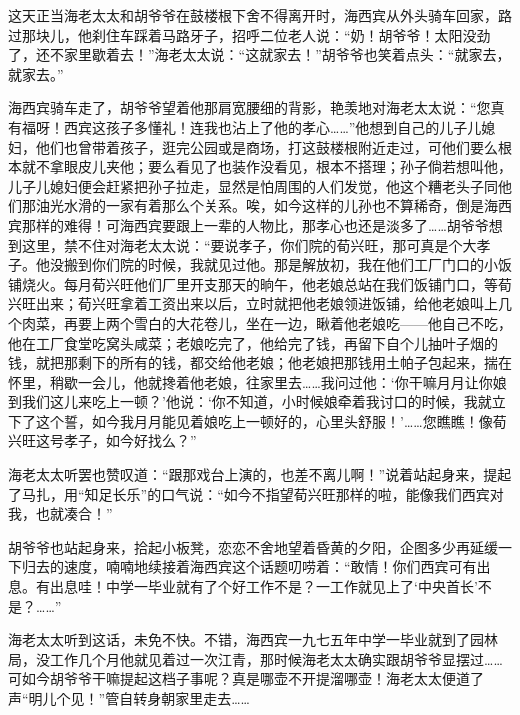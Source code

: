 \par 这天正当海老太太和胡爷爷在鼓楼根下舍不得离开时，海西宾从外头骑车回家，路过那块儿，他刹住车踩着马路牙子，招呼二位老人说：“奶！胡爷爷！太阳没劲了，还不家里歇着去！”海老太太说：“这就家去！”胡爷爷也笑着点头：“就家去，就家去。”
\par 海西宾骑车走了，胡爷爷望着他那肩宽腰细的背影，艳羡地对海老太太说：“您真有福呀！西宾这孩子多懂礼！连我也沾上了他的孝心……”他想到自己的儿子儿媳妇，他们也曾带着孩子，逛完公园或是商场，打这鼓楼根附近走过，可他们要么根本就不拿眼皮儿夹他；要么看见了也装作没看见，根本不搭理；孙子倘若想叫他，儿子儿媳妇便会赶紧把孙子拉走，显然是怕周围的人们发觉，他这个糟老头子同他们那油光水滑的一家有着那么个关系。唉，如今这样的儿孙也不算稀奇，倒是海西宾那样的难得！可海西宾要跟上一辈的人物比，那孝心也还是淡多了……胡爷爷想到这里，禁不住对海老太太说：“要说孝子，你们院的荀兴旺，那可真是个大孝子。他没搬到你们院的时候，我就见过他。那是解放初，我在他们工厂门口的小饭铺烧火。每月荀兴旺他们厂里开支那天的晌午，他老娘总站在我们饭铺门口，等荀兴旺出来；荀兴旺拿着工资出来以后，立时就把他老娘领进饭铺，给他老娘叫上几个肉菜，再要上两个雪白的大花卷儿，坐在一边，瞅着他老娘吃——他自己不吃，他在工厂食堂吃窝头咸菜；老娘吃完了，他给完了钱，再留下自个儿抽叶子烟的钱，就把那剩下的所有的钱，都交给他老娘；他老娘把那钱用土帕子包起来，揣在怀里，稍歇一会儿，他就搀着他老娘，往家里去……我问过他：‘你干嘛月月让你娘到我们这儿来吃上一顿？’他说：‘你不知道，小时候娘牵着我讨口的时候，我就立下了这个誓，如今我月月能见着娘吃上一顿好的，心里头舒服！'……您瞧瞧！像荀兴旺这号孝子，如今好找么？”
\par 海老太太听罢也赞叹道：“跟那戏台上演的，也差不离儿啊！”说着站起身来，提起了马扎，用“知足长乐”的口气说：“如今不指望荀兴旺那样的啦，能像我们西宾对我，也就凑合！”
\par 胡爷爷也站起身来，拾起小板凳，恋恋不舍地望着昏黄的夕阳，企图多少再延缓一下归去的速度，喃喃地续接着海西宾这个话题叨唠着：“敢情！你们西宾可有出息。有出息哇！中学一毕业就有了个好工作不是？一工作就见上了‘中央首长’不是？……”
\par 海老太太听到这话，未免不快。不错，海西宾一九七五年中学一毕业就到了园林局，没工作几个月他就见着过一次江青，那时候海老太太确实跟胡爷爷显摆过……可如今胡爷爷干嘛提起这档子事呢？真是哪壶不开提溜哪壶！海老太太便道了声“明儿个见！”管自转身朝家里走去……


